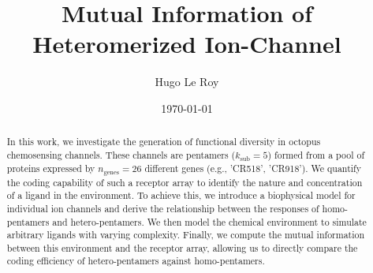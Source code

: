 \documentclass[
    reprint, %
    amsmath,
    amssymb,
    aps,
    prb,      %
    floatfix
]{revtex4-2}
\begin{document}
\title{Mutual Information of Heteromerized Ion-Channel}
\author{Hugo Le Roy}
\date{\today}

\begin{abstract}

In this work, we investigate the generation of functional diversity in octopus chemosensing channels. These channels are pentamers ($k_\text{sub}=5$) formed from a pool of proteins expressed by $n_\text{genes} = 26$ different genes (e.g., 'CR518', 'CR918'). We quantify the coding capability of such a receptor array to identify the nature and concentration of a ligand in the environment. To achieve this, we introduce a biophysical model for individual ion channels and derive the relationship between the responses of homo-pentamers and hetero-pentamers. We then model the chemical environment to simulate arbitrary ligands with varying complexity. Finally, we compute the mutual information between this environment and the receptor array, allowing us to directly compare the coding efficiency of hetero-pentamers against homo-pentamers.

\end{abstract}

\maketitle
\end{document}

